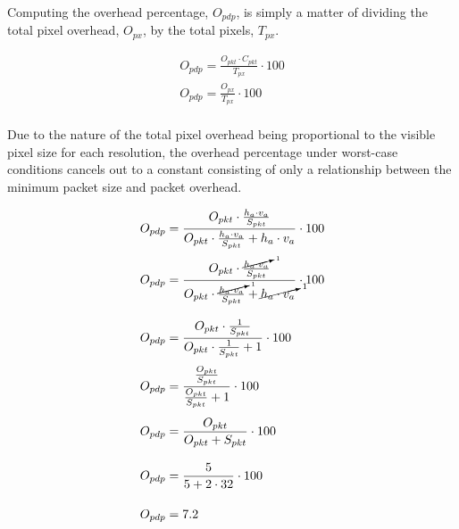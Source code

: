     Computing the overhead percentage, $O_{pdp}$, is simply a matter of dividing the total pixel overhead, $O_{px}$, by the total pixels, $T_{px}$.

    \begin{equation}
        \begin{array}{ l }
            \displaystyle O_{pdp}=\frac{O_{pkt}\cdot C_{pkt}}{T_{px}} \cdot 100 \\[13pt]
            \displaystyle O_{pdp}=\frac{O_{px}}{T_{px}} \cdot 100 \\[13pt]
        \end{array}
        \label{eq:overhead}
    \end{equation}

    Due to the nature of the total pixel overhead being proportional to the visible pixel size for each resolution, the overhead percentage under worst-case conditions cancels out to a constant consisting of only a relationship between the minimum packet size and packet overhead.


    \begin{equation}
        \begin{array}{ l }
            \displaystyle O_{pdp}=\frac{O_{pkt}\cdot \frac{h_a \cdot v_a}{S_{pkt}}}{O_{pkt} \cdot \frac{h_a \cdot v_a}{S_{pkt}} + h_a \cdot v_a} \cdot 100 \\[16pt]
            \displaystyle O_{pdp}=\frac{O_{pkt}\cdot \frac{\cancelto{1}{h_a \cdot v_a}}{S_{pkt}}}{O_{pkt} \cdot \frac{\cancelto{1}{h_a \cdot v_a}}{S_{pkt}} + \cancelto{1}{h_a \cdot v_a}} \cdot 100 \\[25pt]
            \displaystyle O_{pdp}=\frac{O_{pkt}\cdot \frac{1}{S_{pkt}}}{O_{pkt} \cdot \frac{1}{S_{pkt}} + 1} \cdot 100 \\[16pt]
            \displaystyle O_{pdp}=\frac{\frac{O_{pkt}}{S_{pkt}}}{\frac{O_{pkt}}{S_{pkt}} + 1} \cdot 100 \\[19pt]
            \displaystyle O_{pdp}=\frac{O_{pkt}}{O_{pkt}+S_{pkt}} \cdot 100 \\[19pt]
            \displaystyle O_{pdp}=\frac{5}{5 + 2 \cdot 32} \cdot 100 \\[19pt]
            \displaystyle O_{pdp}=7.2 \\[13pt]
        \end{array}
        \label{eq:cancel}
    \end{equation}

